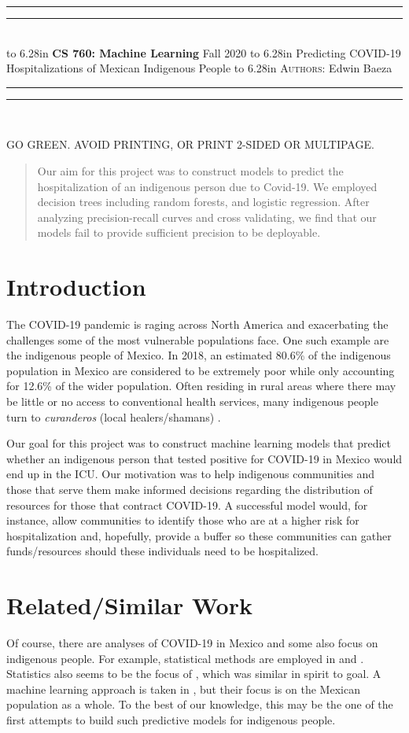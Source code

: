 \documentclass{article}
\newcommand{\lecture}[2]{
\pagestyle{myheadings}
\thispagestyle{plain}
\newpage
\noindent
\begin{center}
\rule{\textwidth}{1.6pt}\vspace*{-\baselineskip}\vspace*{2pt} %
\rule{\textwidth}{0.4pt}\\[1\baselineskip] %
\vbox{\vspace{2mm}
\hbox to 6.28in { {\bf CS 760: Machine Learning} \hfill Fall 2020 }
\vspace{4mm}
\hbox to 6.28in { {\Large \hfill #1  \hfill} }
\vspace{4mm}
\hbox to 6.28in { {\scshape Authors:}  #2 \hfill }}
\vspace{-2mm}
\rule{\textwidth}{0.4pt}\vspace*{-\baselineskip}\vspace{3.2pt} %
\rule{\textwidth}{1.6pt}\\[\baselineskip] %
\end{center}
\vspace*{4mm}
}
\begin{document}
\lecture{Predicting COVID-19 Hospitalizations of Mexican Indigenous People}{Edwin Baeza}

\begin{center}
{\Large {\sf GO GREEN. AVOID PRINTING, OR PRINT 2-SIDED OR MULTIPAGE.}}
\end{center}

\begin{abstract}
Our aim for this project was to construct models to predict the hospitalization of an indigenous person due to Covid-19. We employed decision trees including random forests, and logistic regression. After analyzing precision-recall curves and cross validating, we find that our models fail to provide sufficient precision to be deployable.      

 

\end{abstract}

\section{Introduction}
The COVID-19 pandemic is raging across North America and exacerbating the challenges some of the most vulnerable populations face. One such example are the indigenous people of Mexico. In 2018, an estimated 80.6\% of the indigenous population in Mexico are considered to be extremely poor while only accounting for 12.6\% of the wider population. Often residing in rural areas where there may be little or no access to conventional health services, many indigenous people turn to \emph{curanderos} (local healers/shamans) \cite{un}.     

Our goal for this project was to construct machine learning models that predict whether an indigenous person that tested positive for COVID-19 in Mexico would end up in the ICU. Our motivation was to help indigenous communities and those that serve them make informed decisions regarding the distribution of  resources for those that contract COVID-19. A successful model would, for instance, allow communities to identify those who are at a higher risk for hospitalization and, hopefully, provide a buffer so these communities can gather funds/resources should these individuals need to be hospitalized.      


\section{Related/Similar Work}
Of course, there are analyses of COVID-19 in Mexico and some also focus on indigenous people. For example, statistical methods are employed in \cite{survival_analysis} and \cite{demo_comorbid}. Statistics also seems to be the focus of \cite{impact}, which was similar in spirit to goal. A machine learning approach is taken in  \cite{predictive_models}, but their focus is on the Mexican population as a whole. To the best of our knowledge, this may be the one of the first attempts to build such predictive models for indigenous people.   
\end{document}
